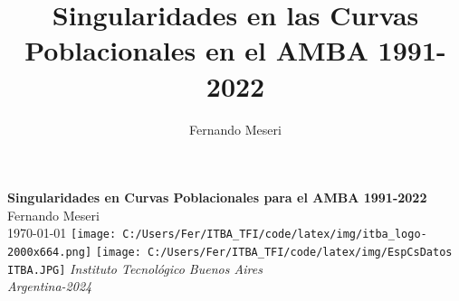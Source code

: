 \documentclass{article}
\title{Singularidades en las Curvas Poblacionales en el AMBA 1991-2022}
\author{Fernando Meseri}
\theoremstyle{mytheoremstyle}
\theoremstyle{mytheoremstyle}
\theoremstyle{myproblemstyle}
\begin{document}
\begin{titlepage}
  \centering
  \vspace*{4cm}
  {\Huge \textbf{Singularidades en Curvas Poblacionales para el AMBA 1991-2022}\\[1em]
   \Large Fernando Meseri\\[1em]
   \today}
  \vfill
  \texttt{[image: C:/Users/Fer/ITBA\_TFI/code/latex/img/itba\_logo-2000x664.png]} %
  \texttt{[image: C:/Users/Fer/ITBA\_TFI/code/latex/img/EspCsDatos ITBA.JPG]} %
  \vfill
  \large \textit{Instituto Tecnológico Buenos Aires}\\
    \vspace{1cm}
  \large \textit{Argentina-2024}
\end{titlepage}


\newpage
\setcounter{page}{1}
\end{document}
